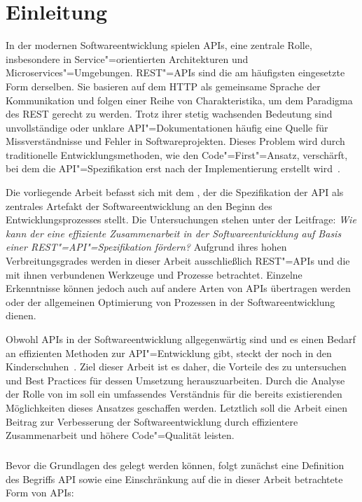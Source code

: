 \chapter{Einleitung}
\label{ch:introduction}
In der modernen Softwareentwicklung spielen \acp{API}, eine zentrale Rolle, insbesondere in Service"=orientierten Architekturen und Microservices"=Umgebungen.
\acs{REST}"=\acsp{API} sind die am häufigsten eingesetzte Form derselben.
Sie basieren auf dem \acf{HTTP} als gemeinsame Sprache der Kommunikation und folgen einer Reihe von Charakteristika, um dem Paradigma des \acf{REST} gerecht zu werden.
Trotz ihrer stetig wachsenden Bedeutung sind unvollständige oder unklare \ac{API}"=Dokumentationen häufig eine Quelle für Missverständnisse und Fehler in Softwareprojekten.
Dieses Problem wird durch traditionelle Entwicklungsmethoden, wie den Code"=First"=Ansatz, verschärft, bei dem die \ac{API}"=Spezifikation erst nach der Implementierung erstellt wird~\cite[73]{bea22}.

Die vorliegende Arbeit befasst sich mit dem \AFA, der die Spezifikation der \ac{API} als zentrales Artefakt der Softwareentwicklung an den Beginn des Entwicklungsprozesses stellt.
Die Untersuchungen stehen unter der Leitfrage: \emph{Wie kann der \AFA eine effiziente Zusammenarbeit in der Softwareentwicklung auf Basis einer \acs{REST}"=\acs{API}"=Spezifikation fördern?}
Aufgrund ihres hohen Verbreitungsgrades werden in dieser Arbeit ausschließlich \acs{REST}"=\acsp{API} und die mit ihnen verbundenen Werkzeuge und Prozesse betrachtet.
Einzelne Erkenntnisse können jedoch auch auf andere Arten von \acp{API} übertragen werden oder der allgemeinen Optimierung von Prozessen in der Softwareentwicklung dienen.

Obwohl \acp{API} in der Softwareentwicklung allgegenwärtig sind und es einen Bedarf an effizienten Methoden zur \ac{API}"=Entwicklung gibt, steckt der \AFA noch in den Kinderschuhen~\cite[78]{bea22}.
Ziel dieser Arbeit ist es daher, die Vorteile des \AFAes zu untersuchen und Best Practices für dessen Umsetzung herauszuarbeiten.
Durch die Analyse der Rolle von \OA im \AFA soll ein umfassendes Verständnis für die bereits existierenden Möglichkeiten dieses Ansatzes geschaffen werden.
Letztlich soll die Arbeit einen Beitrag zur Verbesserung der Softwareentwicklung durch effizientere Zusammenarbeit und höhere Code"=Qualität leisten.

\paragraph{}
Bevor die Grundlagen des \AFAes gelegt werden können, folgt zunächst eine Definition des Begriffs \acf{API} sowie eine Einschränkung auf die in dieser Arbeit betrachtete Form von \acp{API}:

